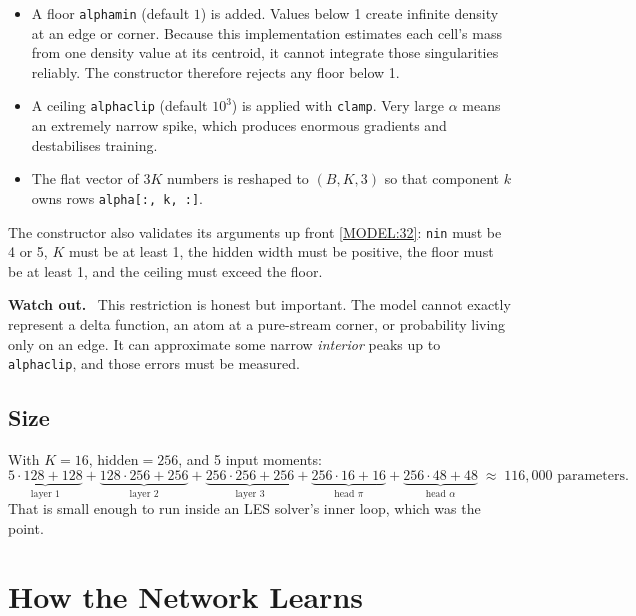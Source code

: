 \documentclass[11pt,a4paper]{report}
\newcommand{\srcbase}{vscode://file/Users/syellapa/Documents/Research/2026/ANSYS/Multi-ScalarPDF}
\newcommand{\dmdn}{dirichlet\string_mdn}
\newcommand{\srctag}[1]{{\footnotesize\textcolor{TagGray}{[#1]}}}
\newcommand{\ModelL}[1]{\href{\srcbase/\dmdn/model.py:#1}{\srctag{MODEL:#1}}}
\newcommand{\code}[1]{\texttt{#1}}
\renewcommand{\_}{\origtextunderscore\allowbreak}
\newlength{\calloutwidth}
\newcommand{\calloutOpen}{%
  \par\medskip\noindent
  \setlength{\calloutwidth}{\dimexpr\linewidth-2\fboxsep\relax}%
  \begin{lrbox}{\calloutbox}\begin{minipage}{\calloutwidth}}
\newcommand{\calloutClose}[1]{%
  \end{minipage}\end{lrbox}\colorbox{#1}{\usebox{\calloutbox}}\par\medskip}
\newenvironment{caution}
  {\calloutOpen\textbf{Watch out.}\ }
  {\calloutClose{WarnBG}}
\begin{document}
\begin{itemize}
  \item A floor \code{alpha\_min} (default $1$) is added. Values below 1 create infinite
        density at an edge or corner. Because this implementation estimates each cell's
        mass from one density value at its centroid, it cannot integrate those singularities
        reliably. The constructor therefore rejects any floor below 1.
  \item A ceiling \code{alpha\_clip} (default $10^{3}$) is applied with \code{clamp}. Very
        large $\alpha$ means an extremely narrow spike, which produces enormous gradients and
        destabilises training.
  \item The flat vector of $3K$ numbers is reshaped to $(B, K, 3)$ so that component $k$ owns
        rows \code{alpha[:, k, :]}.
\end{itemize}

The constructor also validates its arguments up front \ModelL{32}: \code{n\_in} must be 4 or 5,
$K$ must be at least 1, the hidden width must be positive, the floor must be at least 1, and
the ceiling must exceed the floor.

\begin{caution}
This restriction is honest but important. The model cannot exactly represent a delta function,
an atom at a pure-stream corner, or probability living only on an edge. It can approximate
some narrow \emph{interior} peaks up to \code{alpha\_clip}, and those errors must be measured.
\end{caution}

\section{Size}

With $K = 16$, $\text{hidden} = 256$, and 5 input moments:
\[
  \underbrace{5{\cdot}128 + 128}_{\text{layer 1}} +
  \underbrace{128{\cdot}256 + 256}_{\text{layer 2}} +
  \underbrace{256{\cdot}256 + 256}_{\text{layer 3}} +
  \underbrace{256{\cdot}16 + 16}_{\text{head }\pi} +
  \underbrace{256{\cdot}48 + 48}_{\text{head }\alpha}
  \;\approx\; 116{,}000 \text{ parameters.}
\]
That is small enough to run inside an LES solver's inner loop, which was the point.

\chapter{How the Network Learns}
\end{document}
